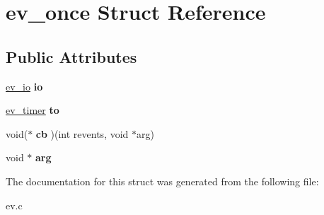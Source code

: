 \hypertarget{structev__once}{}\section{ev\+\_\+once Struct Reference}
\label{structev__once}
\subsection*{Public Attributes}
\begin{DoxyCompactItemize}
\item 
\hypertarget{structev__once_a79ee568256ee0ea8bafb50c5171dcfa8}{}\label{structev__once_a79ee568256ee0ea8bafb50c5171dcfa8} 
\hyperlink{structev__io}{ev\+\_\+io} {\bfseries io}
\item 
\hypertarget{structev__once_a2bde1f0ab49b7160debb6f8f6c867bdc}{}\label{structev__once_a2bde1f0ab49b7160debb6f8f6c867bdc} 
\hyperlink{structev__timer}{ev\+\_\+timer} {\bfseries to}
\item 
\hypertarget{structev__once_a83917293ed96a4e3d5f8b0aeea496d18}{}\label{structev__once_a83917293ed96a4e3d5f8b0aeea496d18} 
void($\ast$ {\bfseries cb} )(int revents, void $\ast$arg)
\item 
\hypertarget{structev__once_afbd70f51924d91e9bcde63706014010e}{}\label{structev__once_afbd70f51924d91e9bcde63706014010e} 
void $\ast$ {\bfseries arg}
\end{DoxyCompactItemize}


The documentation for this struct was generated from the following file\+:\begin{DoxyCompactItemize}
\item 
ev.\+c\end{DoxyCompactItemize}

